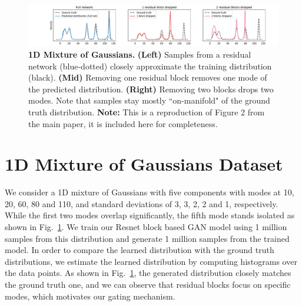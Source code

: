 \documentclass[10pt,twocolumn,letterpaper]{article}
\def\figref#1{Fig.~\ref{#1}}
\begin{document}
\begin{figure}[t]
    \centering
    \includegraphics[width=\linewidth,trim={2.6cm 0 1.8cm 0},clip]{paper_images/mog.pdf}
    \caption{{\bf 1D Mixture of Gaussians.} {\bf (Left)} Samples from a residual network (blue-dotted) closely approximate the training distribution (black). {\bf (Mid)} Removing one residual block removes one mode of the predicted distribution. {\bf (Right)} Removing two blocks drops two modes. Note that samples stay mostly ``on-manifold" of the ground truth distribution. {\bf Note:} This is a reproduction of Figure 2 from the main paper, it is included here for completeness.
    \vspace{-2mm}
    }\label{fig:onedexperiment}
    \vspace{-3mm}
\end{figure}

\section{1D Mixture of Gaussians Dataset}
We consider a 1D mixture of Gaussians with five components with modes at 10, 20, 60, 80 and 110, and standard deviations of 3, 3, 2, 2 and 1, respectively. While the first two modes overlap significantly, the fifth mode stands isolated as shown in \figref{fig:onedexperiment}. We train our Resnet block based GAN model using 1 million samples from this distribution and generate 1 million samples from the trained model. In order to compare the learned distribution with the ground truth distributions, we estimate the learned distribution by computing histograms over the data points. 
As shown in \figref{fig:onedexperiment}, the generated distribution closely matches the ground truth one, and we can observe that  residual blocks focus on specific modes, which motivates our gating mechanism.
\end{document}
